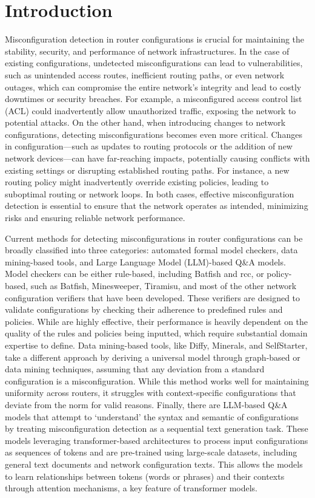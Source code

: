 
\section{Introduction}
\label{sec:intro}
Misconfiguration detection in router configurations is crucial for maintaining the stability, security, and performance of network infrastructures. In the case of existing configurations, undetected misconfigurations can lead to vulnerabilities, such as unintended access routes, inefficient routing paths, or even network outages, which can compromise the entire network's integrity and lead to costly downtimes or security breaches. For example, a misconfigured access control list (ACL) could inadvertently allow unauthorized traffic, exposing the network to potential attacks. On the other hand, when introducing changes to network configurations, detecting misconfigurations becomes even more critical. Changes in configuration—such as updates to routing protocols or the addition of new network devices—can have far-reaching impacts, potentially causing conflicts with existing settings or disrupting established routing paths. For instance, a new routing policy might inadvertently override existing policies, leading to suboptimal routing or network loops. In both cases, effective misconfiguration detection is essential to ensure that the network operates as intended, minimizing risks and ensuring reliable network performance.


Current methods for detecting misconfigurations in router configurations can be broadly classified into three categories: automated formal model checkers, data mining-based tools, and Large Language Model (LLM)-based Q\&A models. Model checkers can be either rule-based, including Batfish and rcc, or policy-based, such as Batfish, Minesweeper, Tiramisu, and most of the other network configuration verifiers that have been developed. These verifiers are designed to validate configurations by checking their adherence to predefined rules and policies. While are highly effective, their performance is heavily dependent on the quality of the rules and policies being inputted, which require substantial domain expertise to define. Data mining-based tools, like Diffy, Minerals, and SelfStarter, take a different approach by deriving a universal model through graph-based or data mining techniques, assuming that any deviation from a standard configuration is a misconfiguration. While this method works well for maintaining uniformity across routers, it struggles with context-specific configurations that deviate from the norm for valid reasons. Finally, there are LLM-based Q\&A models that attempt to `understand' the syntax and semantic of configurations by treating misconfiguration detection as a sequential text generation task. These models leveraging transformer-based architectures to process input configurations as sequences of tokens and are pre-trained using large-scale datasets, including general text documents and network configuration texts. This allows the models to learn relationships between tokens (words or phrases) and their contexts through attention mechanisms, a key feature of transformer models.


